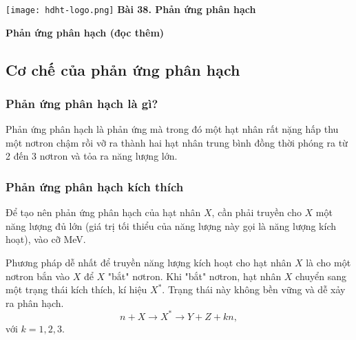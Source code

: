 \newcommand{\chapter}[2][]{
	\newcommand{\chapname}{#2}
	\begin{flushleft}
		\begin{minipage}[t]{\linewidth}
			\texttt{[image: hdht-logo.png]}
			\hspace{0pt}	
			\sffamily\bfseries\large Bài  38. Phản ứng phân hạch
			\begin{flushleft}
				\huge\bfseries #1
			\end{flushleft}
		\end{minipage}
	\end{flushleft}
	\vspace{1cm}
	\normalfont\normalsize
}
\chapter[Phản ứng phân hạch (đọc thêm)]{Phản ứng phân hạch (đọc thêm)}

\subsection{Cơ chế của phản ứng phân hạch}
	\subsubsection{Phản ứng phân hạch là gì?}
	Phản ứng phân hạch là phản ứng mà trong đó một hạt nhân rất nặng hấp thu một nơtron chậm rồi vỡ ra thành hai hạt nhân trung bình đồng thời phóng ra từ 2 đến 3 nơtron và tỏa ra năng lượng lớn.
	\subsubsection{Phản ứng phân hạch kích thích}
	Để tạo nên phản ứng phân hạch của hạt nhân $X$, cần phải truyền cho
	$X$ một năng lượng đủ lớn (giá trị tối thiểu của năng lượng này gọi là năng lượng kích hoạt), vào cỡ MeV.
	
	
	Phương pháp dễ nhất để truyền năng lượng kích hoạt cho hạt nhân $X$ là cho một nơtron bắn vào $X$ để $X$ "bắt" nơtron. Khi "bắt" nơtron, hạt nhân $X$ chuyển sang một trạng thái kích thích, kí hiệu $X^*$. Trạng thái này không bền vững và dễ xảy ra phân hạch.
	\begin{equation}
	n+X\rightarrow X^*\rightarrow Y+Z+kn,
	\end{equation}
	với $k=1,2,3$.
